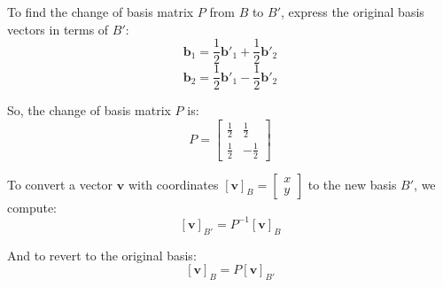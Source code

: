 To find the change of basis matrix \( P \) from \( B \) to \( B' \), express the original basis vectors in terms of \( B' \):
\[ \mathbf{b}_1 = \frac{1}{2} \mathbf{b}'_1 + \frac{1}{2} \mathbf{b}'_2 \]
\[ \mathbf{b}_2 = \frac{1}{2} \mathbf{b}'_1 - \frac{1}{2} \mathbf{b}'_2 \]

So, the change of basis matrix \( P \) is:
\[ P = \begin{bmatrix}
\frac{1}{2} & \frac{1}{2} \\
\frac{1}{2} & -\frac{1}{2}
\end{bmatrix} \]

To convert a vector \( \mathbf{v} \) with coordinates \( [\mathbf{v}]_B = \begin{bmatrix} x \\ y \end{bmatrix} \) to the new basis \( B' \), we compute:
\[ [\mathbf{v}]_{B'} = P^{-1} [\mathbf{v}]_B \]

And to revert to the original basis:
\[ [\mathbf{v}]_B = P [\mathbf{v}]_{B'} \]









